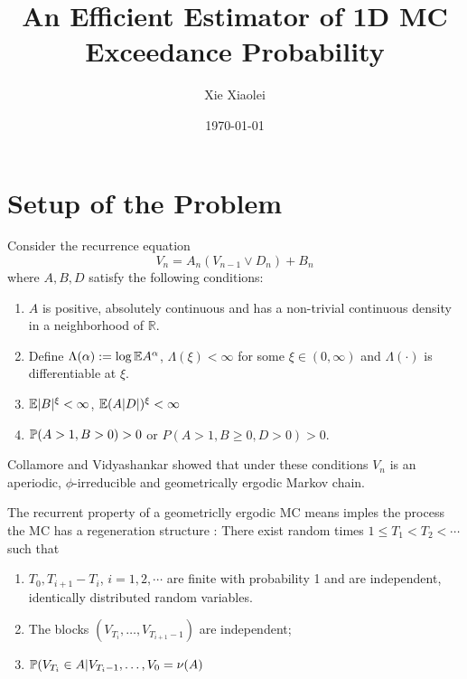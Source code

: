 \documentclass{beamer}
\title{An Efficient Estimator of 1D MC Exceedance Probability} %
\author{Xie Xiaolei} %
\institute[UCPH] %
{
Copenhagen University  \\ %
\medskip
\textit{hnq365@math.ku.dk} %
}
\date{\today} %
\begin{document}
\begin{frame}
\titlepage %
\end{frame}


\section{Setup of the Problem}
\begin{frame}
  Consider the recurrence equation 
  \[
  V_n = A_n (V_{n-1} \vee D_n) + B_n
  \]
  where $A, B, D$ satisfy the following conditions:
  \begin{enumerate}
  \item $A$ is positive, absolutely continuous and has a non-trivial continuous density in
    a neighborhood of $\mathbb R$.
  \item Define $\Lambda(\alpha) := \log \E A^\alpha$, $\Lambda(\xi) < \infty$ for some $\xi \in (0,
    \infty)$ and $\Lambda(\cdot)$ is differentiable at $\xi$.
  \item $\E |B|^\xi < \infty$, $\E (A|D|)^\xi < \infty$
  \item $\P(A > 1, B > 0) > 0$ or $P(A > 1, B \geq 0, D > 0) > 0$.
  \end{enumerate}
  Collamore and Vidyashankar showed \cite{Collamore20133378} that
  under these conditions $V_n$ is an aperiodic, $\phi$-irreducible and
  geometrically ergodic Markov chain.
\end{frame}

\begin{frame}
  The recurrent property of a geometriclly ergodic MC means imples the
  process the MC has a regeneration structure \cite{Nummelin1978}:
  There exist random times $1 \leq T_1 < T_2 < \cdots$ such that
  \begin{enumerate}
  \item $T_0, T_{i+1} - T_{i}$, $i = 1, 2, \cdots$ are finite with
    probability 1 and are independent, identically distributed random
    variables.
  \item The blocks $(V_{T_i}, \dots, V_{T_{i+1} - 1})$ are independent;
  \item $\P(V_{T_i} \in A | V_{T_{i}-1}, \dots, V_0 = \nu(A)$
  \end{enumerate}
\end{frame}
\end{document}
